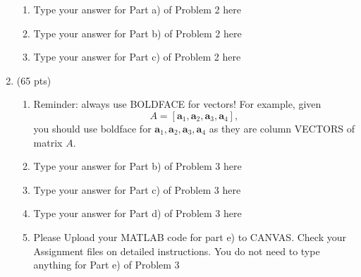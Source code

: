\documentclass[11pt]{article}
\begin{document}
\begin{enumerate}
        \begin{enumerate}

             \item Type your answer for Part a) of Problem 2 here

             \vskip 06pt
             \item Type your answer for Part b) of Problem 2 here

             \vskip 06pt
             \item Type your answer for Part c) of Problem 2 here

        \end{enumerate}


    \item \label{Problem_03} (65 pts)

        \begin{enumerate}


             \item Reminder: always use BOLDFACE for vectors! For example, given
             $$
                A= [\mathbf{a}_1, \mathbf{a}_2, \mathbf{a}_3, \mathbf{a}_4],
             $$
             you should use boldface for $\mathbf{a}_1, \mathbf{a}_2, \mathbf{a}_3, \mathbf{a}_4$ as they are column VECTORS of matrix $A$.

             \vskip 06pt
             \item Type your answer for Part b) of Problem 3 here

             \vskip 06pt
             \item Type your answer for Part c) of Problem 3 here

             \vskip 06pt
             \item Type your answer for Part d) of Problem 3 here

             \vskip 06pt
             \item Please Upload your MATLAB code for part e) to CANVAS. Check your Assignment files on detailed instructions. You do not need to type anything for Part e) of Problem 3

        \end{enumerate}




\end{enumerate}
\end{document}

